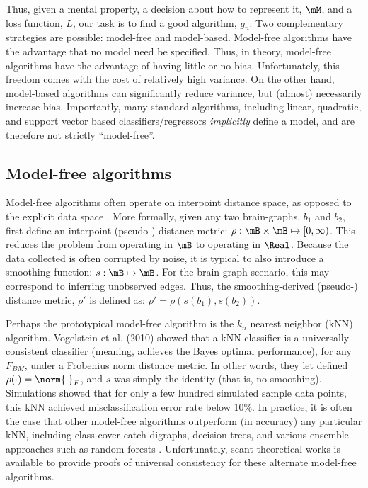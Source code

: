 Thus, given a mental property, a decision about how to represent it, $\mM$, and a loss function, $L$, our task is to find a good algorithm, $g_n$. Two complementary strategies are possible: model-free and model-based. Model-free algorithms have the advantage that no model need be specified. Thus, in theory, model-free algorithms have the advantage of having little or no bias. Unfortunately, this freedom comes with the cost of relatively high variance. On the other hand, model-based algorithms can significantly reduce variance, but (almost) necessarily increase bias. Importantly, many standard algorithms, including linear, quadratic, and support vector based classifiers/regressors \emph{implicitly} define a model, and are therefore not strictly ``model-free''.

\subsection{Model-free algorithms} 

\label{sub:model_free_algorithms}

Model-free algorithms often operate on interpoint distance space, as opposed to the explicit data space \cite{MaaBartoszynski96}. More formally, given any two brain-graphs, $b_1$ and $b_2$, first define an interpoint (pseudo-) distance metric: $\rho: \mB \times \mB \mapsto [0,\infty)$. This reduces the problem from operating in $\mB$ to operating in $\Real$. Because the data collected is often corrupted by noise, it is typical to also introduce a smoothing function: $s: \mB \mapsto \mB$. For the brain-graph scenario, this may correspond to inferring unobserved edges. Thus, the smoothing-derived (pseudo-) distance metric, $\rho'$ is defined as: $\rho' = \rho(s(b_1),s(b_2))$. 

Perhaps the prototypical model-free algorithm is the $k_n$ nearest neighbor (kNN) algorithm. Vogelstein et al. (2010) showed that a kNN classifier is a universally consistent classifier (meaning, achieves the Bayes optimal performance), for any $F_{BM}$, under a Frobenius norm distance metric. In other words, they let defined $\rho(\cdot)=\norm{\cdot}_F$, and $s$ was simply the identity (that is, no smoothing). Simulations showed that for only a few hundred simulated sample data points, this kNN achieved misclassification error rate below 10\%. In practice, it is often the case that other model-free algorithms outperform (in accuracy) any particular kNN, including class cover catch digraphs, decision trees, and various ensemble approaches such as random forests \cite{}. Unfortunately, scant theoretical works is available to provide proofs of universal consistency for these alternate model-free algorithms.

